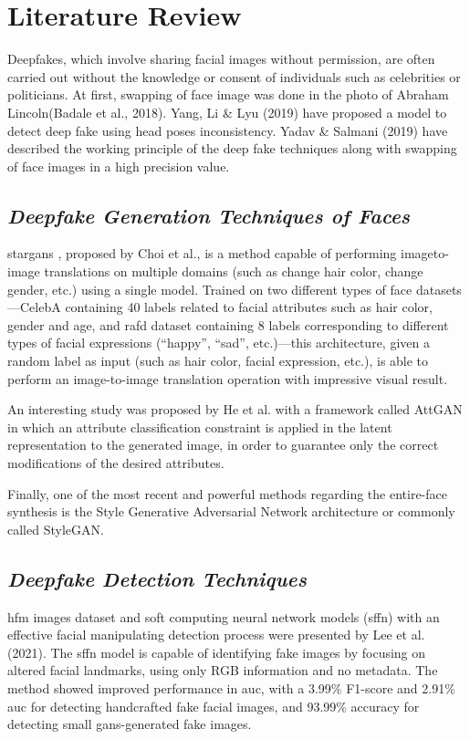 \chapter{Literature Review}
Deepfakes, which involve sharing facial images without permission, are often carried out without the knowledge or consent of individuals such as celebrities or politicians. At first, swapping of face image was done in the photo of Abraham Lincoln(Badale et al., 2018)\cite{badale2018deep}. Yang, Li \& Lyu (2019)\cite{yang2019exposing} have proposed a model to detect deep fake using head poses inconsistency. Yadav \& Salmani (2019)\cite{yadav2019deepfake} have described the working principle of the deep fake techniques along with swapping of face images in a high precision value.

\section{\textit{\small Deepfake Generation Techniques of Faces}}
\acrshort{stargans} \cite{choi2018stargan}, proposed by Choi et al., is a method capable of performing imageto-image translations on multiple domains (such as change hair color, change gender,
etc.) using a single model. Trained on two different types of face datasets—CelebA \cite{7410782}
containing 40 labels related to facial attributes such as hair color, gender and age, and
\acrshort*{rafd} dataset \cite{cho2019imagetoimage} containing 8 labels corresponding to different types of facial expressions
(“happy”, “sad”, etc.)—this architecture, given a random label as input (such as hair color, facial expression, etc.), is able to perform an image-to-image translation operation with impressive visual result. 

An interesting study was proposed by He et al. \cite{7410782} with a framework called
AttGAN in which an attribute classification constraint is applied in the latent representation to the generated image, in order to guarantee only the correct modifications of the
desired attributes. 

Finally, one of the most recent and powerful methods regarding the entire-face synthesis is the Style Generative Adversarial Network architecture or commonly called
StyleGAN. \cite{Giudice_2021}

\section{\textit{\small Deepfake Detection Techniques}}
\acrshort*{hfm} images dataset and soft computing neural network models (\acrshort*{sffn}) with an effective facial manipulating detection process were presented by Lee et al. (2021)\cite{lee2021detecting}. The \acrshort*{sffn} model is capable of identifying fake images by focusing on altered facial landmarks, using only RGB information and no metadata. The method showed improved performance in \acrfull{auc}, with a 3.99\% F1-score and 2.91\% \acrshort{auc} for detecting handcrafted fake facial images, and 93.99\% accuracy for detecting small \acrshort*{gans}-generated fake images.

